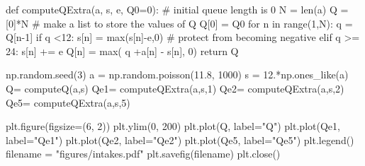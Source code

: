 
def computeQExtra(a, s, e, Q0=0): #  initial queue length is 0
    N = len(a)
    Q = [0]*N # make a list to store the values of  Q
    Q[0] = Q0
    for n in range(1,N):
        q = Q[n-1]
        if  q <12:
            s[n] = max(s[n]-e,0) # protect from becoming negative
        elif q >= 24:
            s[n] += e
        Q[n] = max( q +a[n] - s[n], 0)
    return Q

np.random.seed(3)
a = np.random.poisson(11.8, 1000)
s = 12.*np.ones_like(a)
Q= computeQ(a,s)
Qe1= computeQExtra(a,s,1)
Qe2= computeQExtra(a,s,2)
Qe5= computeQExtra(a,s,5)

plt.figure(figsize=(6, 2))
plt.ylim(0, 200)
plt.plot(Q, label="Q")
plt.plot(Qe1, label="Qe1")
plt.plot(Qe2, label="Qe2")
plt.plot(Qe5, label="Qe5")
plt.legend()
filename = "figures/intakes.pdf"
plt.savefig(filename)
plt.close()


